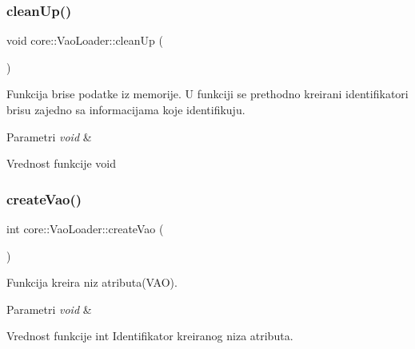 \subsubsection{\texorpdfstring{clean\+Up()}{cleanUp()}}
{\footnotesize\ttfamily void core\+::\+Vao\+Loader\+::clean\+Up (\begin{DoxyParamCaption}\item[{void}]{ }\end{DoxyParamCaption})}



Funkcija brise podatke iz memorije. U funkciji se prethodno kreirani identifikatori brisu zajedno sa informacijama koje identifikuju. 


\begin{DoxyParams}{Parametri}
{\em void} & \\
\hline
\end{DoxyParams}
\begin{DoxyReturn}{Vrednost funkcije}
void 
\end{DoxyReturn}
\mbox{\label{classcore_1_1VaoLoader_af76598a15d38378e594778d9a63a7a6a}} 
\subsubsection{\texorpdfstring{create\+Vao()}{createVao()}}
{\footnotesize\ttfamily int core\+::\+Vao\+Loader\+::create\+Vao (\begin{DoxyParamCaption}\item[{void}]{ }\end{DoxyParamCaption})\hspace{0.3cm}{\ttfamily [private]}}



Funkcija kreira niz atributa(\+V\+A\+O). 


\begin{DoxyParams}{Parametri}
{\em void} & \\
\hline
\end{DoxyParams}
\begin{DoxyReturn}{Vrednost funkcije}
int Identifikator kreiranog niza atributa. 
\end{DoxyReturn}
\mbox{\label{classcore_1_1VaoLoader_aeefd4de3346c1036d8d7249694fd404d}} 
